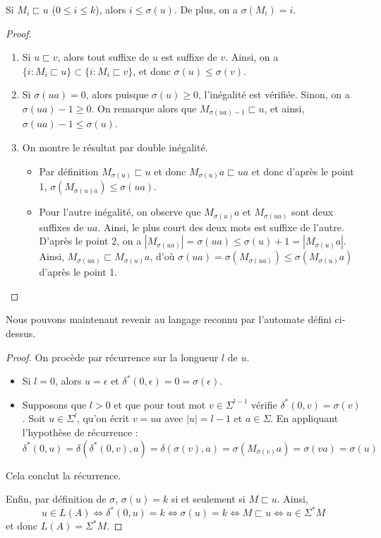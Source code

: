 \begin{rem}
Si $M_i \sqsubset u$ ($0\leq i \leq k$), alors $i\leq \sigma(u)$. De plus, on a $\sigma(M_i)=i$.
\end{rem}
\begin{proof}~

\begin{enumerate}
\item Si $u\sqsubset v$, alors tout suffixe de $u$ est suffixe de $v$. Ainsi, on a $\{i : M_i \sqsubset u\} \subset \{i : M_i \sqsubset v\}$, et donc $\sigma(u) \leq \sigma(v)$.

\item Si $\sigma(ua)=0$, alors puisque $\sigma(u)\geq 0$, l'inégalité est vérifiée. Sinon, on a $\sigma(ua)-1\geq 0$. On remarque alors que $M_{\sigma(ua)-1} \sqsubset u$, et ainsi, $\sigma(ua)-1 \leq \sigma(u)$.

\item On montre le résultat par double inégalité. 

\begin{itemize}
\item Par définition $M_{\sigma(u)} \sqsubset u$ et donc $M_{\sigma(u)}a \sqsubset ua$ et donc d'après le point 1, $\sigma(M_{\sigma(u)a}) \leq \sigma(ua)$.

\item Pour l'autre inégalité, on observe que $M_{\sigma(u)}a$ et $M_{\sigma(ua)}$ sont deux suffixes de $ua$. Ainsi, le plus court des deux mots est suffixe de l'autre. D'après le point 2, on a $
|M_{\sigma(ua)} | = \sigma(ua) \leq \sigma(u)+1 =|M_{\sigma(u)}a|$.
Ainsi, $M_{\sigma(ua)} \sqsubset M_{\sigma(u)}a$, d'où $\sigma(ua) = \sigma(M_{\sigma(ua)}) \leq \sigma(M_{\sigma(u)}a)$ d'après le point 1. 
\end{itemize}
\end{enumerate}
\end{proof}

Nous pouvons maintenant revenir au langage reconnu par l'automate défini ci-dessus.

\begin{proof}
On procède par récurrence sur la longueur $l$ de $u$.
\begin{itemize}[label =$\bullet$]
\item Si $l=0$, alors $u=\epsilon$ et $\delta^*(0,\epsilon) =0 = \sigma(\epsilon)$.
\item Supposons que $l>0$ et que pour tout mot $v\in \Sigma^{l-1}$ vérifie $\delta^*(0,v) = \sigma(v)$. Soit $u\in \Sigma^l$, qu'on écrit $v=ua$ avec $|u|=l-1$ et $a\in \Sigma$. En appliquant l'hypothèse de récurrence :
$$
\delta^*(0,u) =\delta(\delta^*(0,v),a) = \delta(\sigma(v),a) = \sigma \left( M_{\sigma(v)}a\right) = \sigma(va) = \sigma(u)
$$
\end{itemize}
Cela conclut la récurrence.

Enfin, par définition de $\sigma$, $\sigma(u)=k$ si et seulement si $M \sqsubset u$. Ainsi, 
$$
u\in L(A) \Leftrightarrow \delta^*(0,u)=k \Leftrightarrow \sigma(u)=k \Leftrightarrow M \sqsubset u \Leftrightarrow u \in \Sigma^*M
$$
et donc $L(A)=\Sigma^*M$.
\end{proof}

